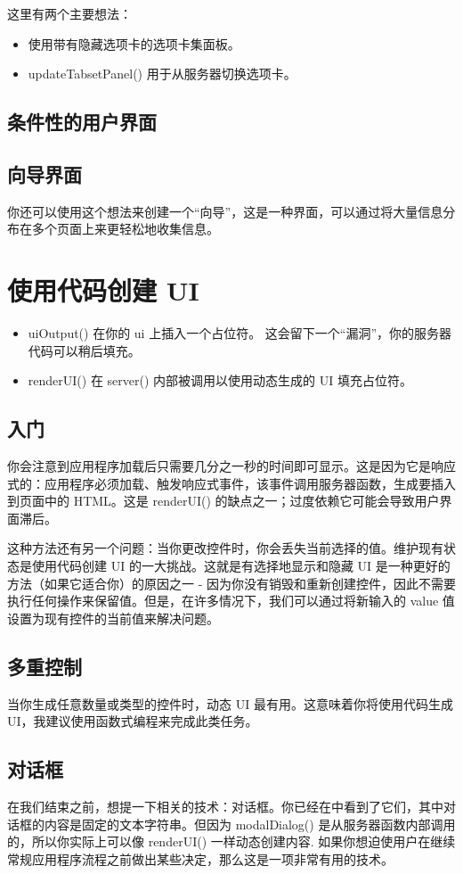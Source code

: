 这里有两个主要想法：
\begin{itemize}
    \item 使用带有隐藏选项卡的选项卡集面板。
    \item updateTabsetPanel() 用于从服务器切换选项卡。
\end{itemize}
\subsection{条件性的用户界面}
\subsection{向导界面}
你还可以使用这个想法来创建一个“向导”，这是一种界面，可以通过将大量信息分布在多个页面上来更轻松地收集信息。
\section{使用代码创建 UI}
\begin{itemize}
    \item uiOutput() 在你的 ui 上插入一个占位符。 这会留下一个“漏洞”，你的服务器代码可以稍后填充。
    \item renderUI() 在 server() 内部被调用以使用动态生成的 UI 填充占位符。
\end{itemize}
\subsection{入门}
你会注意到应用程序加载后只需要几分之一秒的时间即可显示。这是因为它是响应式的：应用程序必须加载、触发响应式事件，该事件调用服务器函数，生成要插入到页面中的 HTML。这是 renderUI() 的缺点之一；过度依赖它可能会导致用户界面滞后。

这种方法还有另一个问题：当你更改控件时，你会丢失当前选择的值。维护现有状态是使用代码创建 UI 的一大挑战。这就是有选择地显示和隐藏 UI 是一种更好的方法（如果它适合你）的原因之一 - 因为你没有销毁和重新创建控件，因此不需要执行任何操作来保留值。但是，在许多情况下，我们可以通过将新输入的 value 值设置为现有控件的当前值来解决问题。
\subsection{多重控制}
当你生成任意数量或类型的控件时，动态 UI 最有用。这意味着你将使用代码生成 UI，我建议使用函数式编程来完成此类任务。
\subsection{对话框}
在我们结束之前，想提一下相关的技术：对话框。你已经在中看到了它们，其中对话框的内容是固定的文本字符串。但因为 modalDialog() 是从服务器函数内部调用的，所以你实际上可以像 renderUI() 一样动态创建内容. 如果你想迫使用户在继续常规应用程序流程之前做出某些决定，那么这是一项非常有用的技术。
